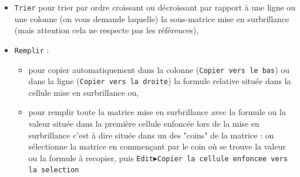 \documentclass[a4paper,11pt]{article}
\begin{document}
\begin{itemize}
\begin{itemize}
automatiquement,
\item {\tt Ne pas recalculer automatiquement} pour que le tableur ne soit 
pas recalcul\'e automatiquement : le recalcul ne se fait alors que si on appuie
sur le bouton {\tt eval},
\item {\tt Distribuer une matrice sur plusieurs cellules} va permettre de 
remplir 
plusieurs cellules avec une matrice : par exemple si on s\'electionne {\tt A0}
et que l'on tape dans la ligne de commandes du tableur {\tt [1,2,3]}, cela 
remplira 3 cellules, en mettant 1 dans {\tt A0}, 2 dans {\tt B0} et 3 dans 
{\tt C0}, par contre si on tape dans la ligne de commandes du tableur
 {\tt =[1,2,3]} cela mettra [1,2,3] dans {\tt A0}.
\item {\tt Conserver une matrice dans une seule cellule} permet de remplir une 
cellule avec une matrice : par exemple si on s\'electionne {\tt A0}
et que l'on tape dans la ligne de commandes du tableur {\tt [1,2,3]} ou 
{\tt =[1,2,3]}, cela mettra [1,2,3] dans {\tt A0}.
\item {\tt Portrait} pour avoir l'\'ecran de repr\'esentation graphique du 
tableur \`a droite du tableur,
\item {\tt Paysage} pour avoir l'\'ecran de repr\'esentation graphique du 
tableur en dessous du tableur,
\item {\tt Cacher graph} pour ne pas avoir d'\'ecran de repr\'esentation
graphique associ\'e au tableur.
\end{itemize}
\item {\tt Trier} pour trier par ordre croissant ou d\'ecroissant par rapport
\`a une ligne ou une colonne (on vous demande laquelle) la sous-matrice mise 
en surbrillance (mais attention cela ne respecte pas les r\'ef\'erences),
\item {\tt Remplir} :
\begin{itemize}
\item pour copier automatiquement dans la colonne 
({\tt Copier vers le bas}) ou dans la ligne ({\tt Copier vers la droite}) la 
formule relative situ\'ee dans la cellule mise en surbrillance ou,
\item pour remplir toute la matrice mise en surbrillance avec la formule ou 
la valeur situ\'ee dans la premi\`ere cellule enfonc\'ee lors de la mise en 
surbrillance c'est \`a dire situ\'ee dans un des "coins" de la matrice : on 
s\'electionne la matrice en commen\c{c}ant par le coin o\`u se trouve la valeur
 ou la formule \`a recopier, puis 
{\tt Edit$\blacktriangleright$Copier la cellule enfoncee vers la selection} 

\end{itemize}
\end{itemize}
\end{document}
